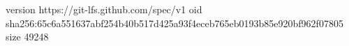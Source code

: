 version https://git-lfs.github.com/spec/v1
oid sha256:65c6a551637abf254b40b517d425a93f4eceb765eb0193b85e920bf962f07805
size 49248
